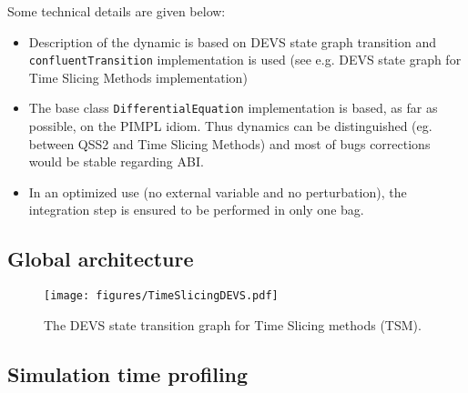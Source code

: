 \documentclass{article}
\theoremstyle{remark}
\begin{document}
Some technical details are given below:
\begin{itemize}
  \item Description of the dynamic is based on DEVS state graph transition 
  and {\tt confluentTransition} implementation is used (see e.g. DEVS state
  graph for Time Slicing Methods implementation) 
  \item The base class {\tt DifferentialEquation} implementation is based,
  as far as possible, on the PIMPL idiom. Thus dynamics can be distinguished
  (eg. between QSS2 and Time Slicing Methods) and most of bugs corrections 
  would be stable regarding ABI.
  \item In an optimized use (no external variable and no perturbation), the
  integration step is ensured to be performed in only one bag.  
\end{itemize}


\subsection{Global architecture}
\label{sec:archi}

\begin{landscape}
\vspace{-10cm}
\begin{figure}[!h]
\begin{center} 
\texttt{[image: figures/TimeSlicingDEVS.pdf]}
\caption{\label{DEVSgraph} The DEVS state transition graph 
for Time Slicing methods (TSM).}
\end{center}
\end{figure}
\end{landscape}

\subsection{Simulation time profiling}
\end{document}
